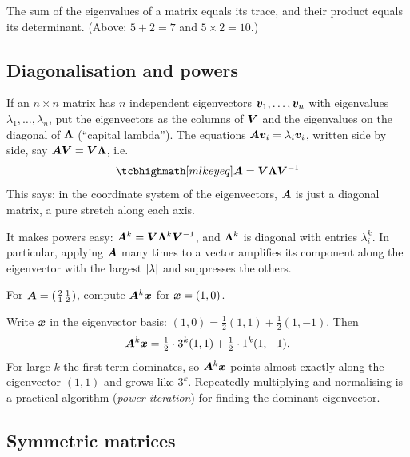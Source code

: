 \begin{proposition}\label{prop:trace-det}
The sum of the eigenvalues of a matrix equals its trace, and their product
equals its determinant. (Above: $5 + 2 = 7$ and $5 \times 2 = 10$.)
\end{proposition}

\subsection{Diagonalisation and powers}

If an $n\times n$ matrix has $n$ independent eigenvectors $\bm{v}_1, \dots, \bm{v}_n$
with eigenvalues $\lambda_1, \dots, \lambda_n$, put the eigenvectors as the
columns of $\bm{V}$ and the eigenvalues on the diagonal of $\bm{\Lambda}$
(``capital lambda''). The equations $\bm{A}\bm{v}_i = \lambda_i\bm{v}_i$, written side by
side, say $\bm{A}\bm{V} = \bm{V}\bm{\Lambda}$, i.e.
\[
  \keyeq{\mA = \mV\mLambda\mV^{-1}}
\]
This  says: in the coordinate system of the
eigenvectors, $\bm{A}$ is just a diagonal matrix, a pure stretch along each axis.

It makes powers easy: $\bm{A}^k = \bm{V}\bm{\Lambda}^k\bm{V}^{-1}$, and $\bm{\Lambda}^k$ is
diagonal with entries $\lambda_i^k$. In particular, applying $\bm{A}$ many times
to a vector amplifies its component along the eigenvector with the largest
$\lvert\lambda\rvert$ and suppresses the others.

\begin{example}\label{ex:power-iteration}
For $\bm{A} = \left(\begin{smallmatrix} 2 & 1\\ 1 & 2\end{smallmatrix}\right)$,
compute $\bm{A}^k\bm{x}$ for $\bm{x} = (1, 0)$.

\sol Write $\bm{x}$ in the eigenvector basis: $(1, 0) = \frac12(1, 1) +
\frac12(1, -1)$. Then
\[
  \bm{A}^k\bm{x} = \tfrac12\cdot3^k(1, 1) + \tfrac12\cdot1^k(1, -1).
\]
For large $k$ the first term dominates, so $\bm{A}^k\bm{x}$ points almost exactly
along the eigenvector $(1, 1)$ and grows like $3^k$. Repeatedly multiplying and
normalising is a practical algorithm (\emph{power iteration}) for finding the
dominant eigenvector.
\end{example}

\subsection{Symmetric matrices}

